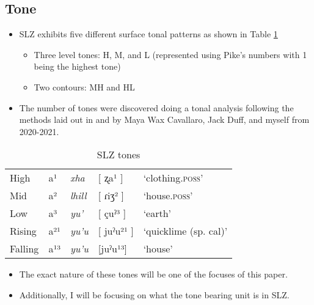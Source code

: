 \documentclass[12pt, letterpaper]{article}
\providecommand{\lsptoprule}{\midrule\toprule}
\providecommand{\lspbottomrule}{\bottomrule\midrule}
\begin{document}
\subsection{Tone} \label{sec:Tone}

\begin{itemize}
	\item SLZ exhibits five different surface tonal patterns as shown in Table \ref{tab:tones}
		\begin{itemize}
			\item Three level tones: H, M, and L (represented using Pike's numbers with 1 being the highest tone)
			\item Two contours: MH and HL
		\end{itemize}
	\item The number of tones were discovered doing a tonal analysis following the methods laid out in \citet{pikeToneLanguagesTechnique1948} and \citet{sniderToneAnalysisField2018} by Maya Wax Cavallaro, Jack Duff, and myself from 2020-2021.
\end{itemize}

\begin{table}[!h]
\centering
\caption{SLZ tones}
\label{tab:tones}
 \begin{tabular}{lllll}
  \lsptoprule
  High   	&  a¹  &  \textit{xha}   &  [ ʐa¹ ] & `clothing.\textsc{poss}'\\
	Mid    	&  a²  &  \textit{lhill} 	& [ ɾiʒ² ] & `house.\textsc{poss}' \\
	Low   	&  a³  &  \textit{yu'} 	&	 [ çuˀ³ ] & `earth'\\
	Rising	&  a²¹  &  \textit{yu'u} 	&	[ juˀu²¹ ] & `quicklime (sp. cal)' \\
	Falling &  a¹³  &  \textit{yu'u}  &	[juˀu¹³] &	`house' \\
  \lspbottomrule
 \end{tabular}
\end{table}

\begin{itemize}
	\item The exact nature of these tones will be one of the focuses of this paper.
	\item Additionally, I will be focusing on what the tone bearing unit is in SLZ.
\end{itemize}

\end{document}
